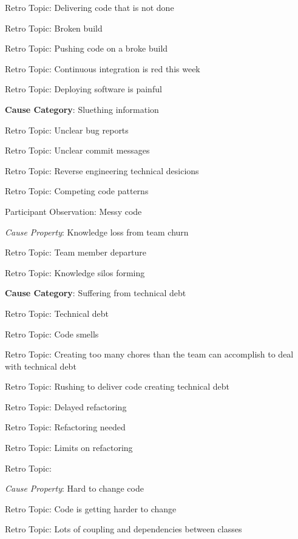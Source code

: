 \quad \quad Retro Topic: Delivering code that is not done

\quad \quad Retro Topic: Broken build

\quad \quad Retro Topic: Pushing code on a broke build

\quad \quad Retro Topic: Continuous integration is red this week

\quad \quad Retro Topic: Deploying software is painful

\quad \textbf{Cause Category}: Sluething information

\quad \quad Retro Topic: Unclear bug reports

\quad \quad Retro Topic: Unclear commit messages

\quad \quad Retro Topic: Reverse engineering technical desicions

\quad \quad Retro Topic: Competing code patterns

\quad \quad Participant Observation: Messy code

\quad \quad \textit{Cause Property}: Knowledge loss from team churn

\quad \quad Retro Topic: Team member departure

\quad \quad Retro Topic: Knowledge silos forming

\quad \textbf{Cause Category}: Suffering from technical debt

\quad \quad Retro Topic: Technical debt

\quad \quad Retro Topic: Code smells

\quad \quad Retro Topic: Creating too many chores than the team can accomplish to deal with technical debt

\quad \quad Retro Topic: Rushing to deliver code creating technical debt

\quad \quad \quad Retro Topic: Delayed refactoring

\quad \quad \quad Retro Topic: Refactoring needed 

\quad \quad \quad Retro Topic: Limits on refactoring

\quad \quad \quad Retro Topic: 

\quad \quad \textit{Cause Property}: Hard to change code

\quad \quad \quad Retro Topic: Code is getting harder to change

\quad \quad \quad Retro Topic: Lots of coupling and dependencies between classes

